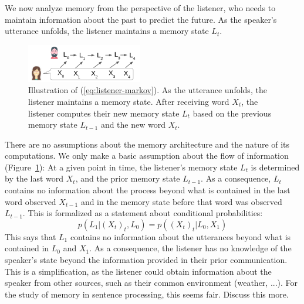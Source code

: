 \documentclass[11pt,letterpaper]{article}
\begin{document}
We now analyze memory from the perspective of the listener, who needs to maintain information about the past to predict the future.
As the speaker's utterance unfolds, the listener maintains a memory state $L_t$.



\begin{figure}
\includegraphics[width=0.45\textwidth]{figures/markov-condition.png}
	\caption{Illustration of (\ref{eq:listener-markov}). As the utterance unfolds, the listener maintains a memory state. After receiving word $X_t$, the listener computes their new memory state $L_t$ based on the previous memory state $L_{t-1}$ and the new word $X_t$.}\label{fig:listener-markov}
\end{figure}





There are no assumptions about the memory architecture and the nature of its computations.
We only make a basic assumption about the flow of information (Figure~\ref{fig:listener-markov}):
At a given point in time, the listener's memory state $L_t$ is determined by the last word $X_t$, and the prior memory state $L_{t-1}$.
As a consequence, $L_t$ contains no information about the process beyond what is contained in the last word observed $X_{t-1}$ and in the memory state before that word was observed $L_{t-1}$.
This is formalized as a statement about conditional probabilities:
	\begin{equation}\label{eq:listener-markov}
p(L_1| (X_{t})_t, L_0)   = p((X_{t})_t| L_0, X_1)
	\end{equation}
This says that $L_1$ contains no information about the utterances beyond what is contained in $L_0$ and $X_1$.	
As a consequence, the listener has no knowledge of the speaker's state beyond the information provided in their prior communication.
This is a simplification, as the listener could obtain information about the speaker from other sources, such as their common environment (weather, ...).
For the study of memory in sentence processing, this seems fair. Discuss this more.
\end{document}
